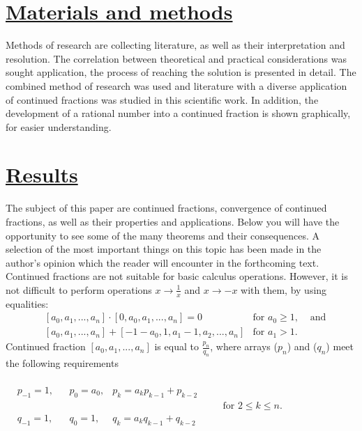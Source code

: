 \documentclass{article}
\begin{document}
\begin{multicols}{2}
\section*{\underline{Materials and methods}}

Methods of research are collecting \text literature, as well as their interpretation and \text resolution.
The correlation between \text theoretical and practical considerations was sought
\text application, the process of \text reaching the \text solution is presented in detail. The combined method of \text research was used and literature with a diverse application of continued fractions was studied in this scientific work. In addition, the development of a rational number into a continued fraction is shown graphically, for easier understanding.
\noindent

\section*{\underline{Results}}
The subject of this paper are continued fractions, \text convergence of continued fractions, as well as their properties and applications. Below you will have the opportunity to see some of the many theorems and their consequences. A selection of the most important things on this topic has been made in the author's \text opinion which the reader will encounter in the forthcoming text.\\
Continued fractions are not suitable for basic \text calculus operations. However, it is not difficult to perform \text operations $x\to\frac{1}{x}$ and $ x \to -x $ with
them, by using \\equalities:
\begin{align*}
    &[a_0,a_1,...,a_n] \cdot [0,a_0,a_1,...,a_n]=0 &\text{for } a_0\geq 1,& \text{ and}\\
    &[a_0,a_1,...,a_n] + [-1-a_0,1,a_1-1,a_2,...,a_n] &\text{for } a_1>1.&
\end{align*}
Continued fraction $[a_0, a_1, . . . , a_n]$ is equal to $\frac{p_n}{q_n}$, where arrays ($p_n$) and ($q_n$) meet the following requirements
\begin{center}
$\begin{aligned}\\[-10mm]
    &p_{-1}=1,& &p_0=a_0, &p_k=a_kp_{k-1}+p_{k-2}&\\[-3mm]
    &&&&&&\quad\text{for } 2\leq k\leq n.\\[-3mm]
    &q_{-1}=1,& &q_0=1, &q_k=a_kq_{k-1}+q_{k-2}&
\end{aligned}$

\end{center}
\end{multicols}
\end{document}
